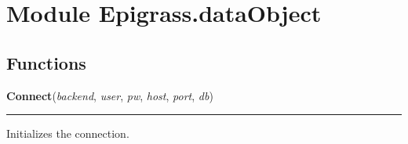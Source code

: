 %
%
%


\section{Module Epigrass.dataObject}

    \label{Epigrass:dataObject}


  \subsection{Functions}

    \label{Epigrass:dataObject:Connect}

    \vspace{0.5ex}

    \begin{boxedminipage}{\textwidth}

    \raggedright \textbf{Connect}(\textit{backend}, \textit{user}, \textit{pw}, \textit{host}, \textit{port}, \textit{db})

    \vspace{-1.5ex}

    \rule{\textwidth}{0.5\fboxrule}
    Initializes the connection.

    \vspace{1ex}

    \end{boxedminipage}



